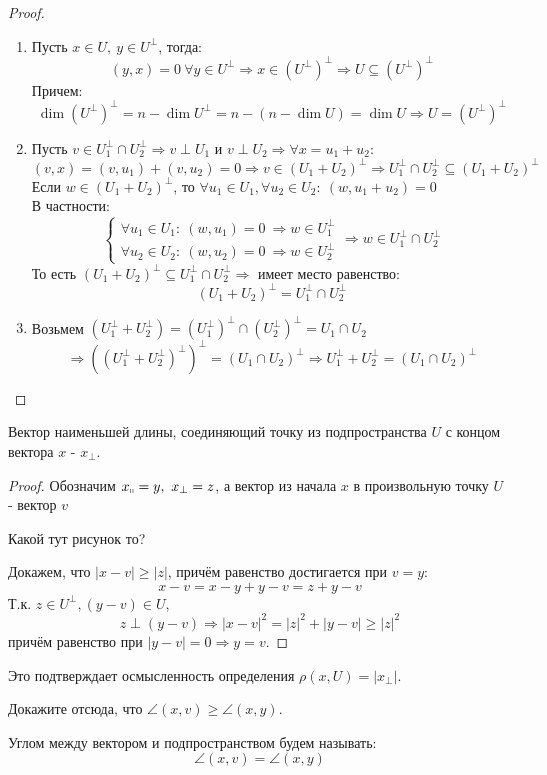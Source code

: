 \begin{proof}\tab
    \begin{enumerate}
        \item Пусть $x\in U,\ y\in U^\perp$, тогда: 
        $$(y,x)=0\ \forall y\in U^\perp \Rightarrow x\in (U^\perp)^\perp \Longrightarrow  U\subseteq (U^\perp)^\perp$$ 
        Причем: 
        $$\dim{(U^\perp)^\perp}=n-\dim{U^\perp}=n-(n-\dim{U})=\dim{U}\Longrightarrow  U=(U^\perp)^\perp$$

        \item Пусть $v\in U_1^\perp\cap U_2^\perp \Longrightarrow  v\perp U_1$ и $v\perp U_2 \Longrightarrow  \forall x=u_1+u_2$:
        $$(v,x)=(v,u_1)+(v,u_2)=0 \Longrightarrow  v\in (U_1+U_2)^\perp \Longrightarrow  U_1^\perp \cap U_2^\perp \subseteq (U_1+U_2)^\perp$$
        Если $w\in (U_1+U_2)^\perp$, то $\forall u_1\in U_1, \forall u_2\in U_2 :\ (w, u_1+u_2)=0$\\
        В частности: 
        $$\begin{cases}
            \forall u_1\in U_1: \ (w, u_1)=0 \ \Longrightarrow  w\in U_1^\perp\\
            \forall u_2\in U_2: \ (w, u_2)=0 \ \Longrightarrow  w\in U_2^\perp
        \end{cases} \Longrightarrow  w\in U_1^\perp\cap U_2^\perp$$
        То есть $(U_1+U_2)^\perp \subseteq U_1^\perp \cap U_2^\perp \Longrightarrow $ имеет место равенство:
        $$(U_1+U_2)^\perp=U_1^\perp\cap U_2^\perp$$

        \item Возьмем $(U_1^\perp+U_2^\perp)=(U_1^\perp)^\perp \cap (U_2^\perp)^\perp=U_1 \cap U_2$
        $$\Longrightarrow  ((U_1^\perp+U_2^\perp)^\perp)^\perp=(U_1\cap U_2)^\perp \Longrightarrow  U_1^\perp+U_2^\perp=(U_1 \cap U_2)^\perp$$
    \end{enumerate}
\end{proof}
\begin{subtheorem}
    Вектор наименьшей длины, соединяющий точку из подпространства $U$ с концом вектора $x$ - $x_{\perp}$. 
\end{subtheorem}
\begin{proof}
    Обозначим $x_{\shortparallel} = y, \ x_{\perp} = z$, а вектор из начала $x$ в произвольную точку $U$ - вектор $v$
    \begin{center}
        Какой тут рисунок то?
    \end{center}
    Докажем, что $|x-v|\geqslant |z|$, причём равенство достигается при $v = y$:
    $$x - v = x - y + y - v = z + y - v$$
    Т.к. $z \in U^{\perp}, (y - v) \in U$,
    $$z \perp (y-v) \Longrightarrow |x-v|^2 = |z|^2 + |y-v| \geqslant |z|^2$$
    причём равенство при $|y - v| = 0 \Longrightarrow y = v$.
\end{proof}
Это подтверждает осмысленность определения $\rho(x, U) = |x_{\perp}|$.
\begin{exercise}
    Докажите отсюда, что $\angle(x, v) \geqslant \angle(x, y)$.
\end{exercise}
\begin{definition}
    Углом между вектором и подпространством будем называть: 
    $$\angle(x, v) = \angle(x, y)$$
\end{definition}

